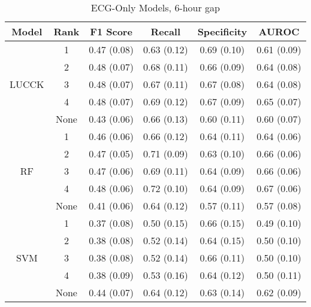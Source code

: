 

\begin{table}
    \small
    \centering
    \caption{ECG-Only Models, 6-hour gap}
    \begin{tabularx}{\textwidth}{|c|c|C|C|C|C|}
    \hline
        Model & Rank & F1 Score & Recall & Specificity & AUROC \\
        \hline
          & 1 & 0.47 (0.08) & 0.63 (0.12) & 0.69 (0.10) & 0.61 (0.09)\\
          & 2 & 0.48 (0.07) & 0.68 (0.11) & 0.66 (0.09) & 0.64 (0.08)\\
         LUCCK & 3 & 0.48 (0.07) & 0.67 (0.11) & 0.67 (0.08) & 0.64 (0.08)\\
          & 4 & 0.48 (0.07) & 
         0.69 (0.12) & 0.67 (0.09) & 0.65 (0.07)\\
          & None & 0.43 (0.06) & 0.66 (0.13) & 0.60 (0.11) & 0.60 (0.07)\\
        \hline
         & 1 & 0.46 (0.06) & 0.66 (0.12) & 0.64 (0.11) & 0.64 (0.06)\\
          & 2 & 0.47 (0.05) & 0.71 (0.09) & 0.63 (0.10) & 0.66 (0.06)\\
         RF & 3 & 0.47 (0.06) & 0.69 (0.11) & 0.64 (0.09) & 0.66 (0.06)\\
          & 4 & 0.48 (0.06) & 0.72 (0.10) & 0.64 (0.09) & 0.67 (0.06)\\
          & None & 0.41 (0.06) & 0.64 (0.12) & 0.57 (0.11) & 0.57 (0.08)\\
        \hline
          & 1 & 0.37 (0.08) & 0.50 (0.15) & 0.66 (0.15) & 0.49 (0.10)\\
          & 2 & 0.38 (0.08) & 0.52 (0.14) & 0.64 (0.15) & 0.50 (0.10)\\
         SVM & 3 & 0.38 (0.08) & 0.52 (0.14) & 0.66 (0.11) & 0.50 (0.10)\\
          & 4 & 0.38 (0.09) & 0.53 (0.16) & 0.64 (0.12) & 0.50 (0.11)\\
          & None & 0.44 (0.07) & 0.64 (0.12) & 0.63 (0.14) & 0.62 (0.09)\\
        \hline                 
    \end{tabularx}
\end{table}

